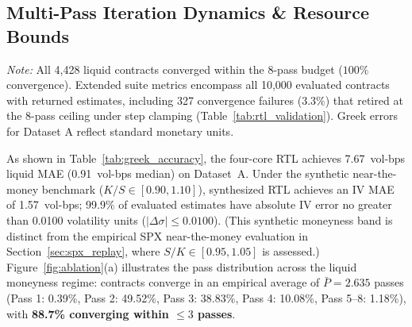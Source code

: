 \documentclass[sigconf,anonymous,review]{acmart}
\begin{document}
\subsection{Multi-Pass Iteration Dynamics \& Resource Bounds}
\label{sec:eval_multipass}
\begin{table}[t]
\caption{Implied Volatility and Greek Accuracy (Synthesized RTL vs. Double-Precision Reference, Dataset A)}
\label{tab:greek_accuracy}
\centering
{}
\vskip 1pt\raggedright
\footnotesize{\textit{Note:} All 4,428 liquid contracts converged within the 8-pass budget ($100\%$ convergence). Extended suite metrics encompass all 10,000 evaluated contracts with returned estimates, including 327 convergence failures ($3.3\%$) that retired at the 8-pass ceiling under step clamping (Table~\ref{tab:rtl_validation}). Greek errors for Dataset A reflect standard monetary units.}
\end{table}
As shown in Table~\ref{tab:greek_accuracy}, the four-core RTL achieves 7.67~vol-bps liquid MAE (0.91~vol-bps median) on Dataset~A. Under the synthetic near-the-money benchmark ($K/S \in [0.90, 1.10]$), synthesized RTL achieves an IV MAE of 1.57~vol-bps; 99.9\% of evaluated estimates have absolute IV error no greater than 0.0100 volatility units ($|\Delta\sigma| \le 0.0100$). (This synthetic moneyness band is distinct from the empirical SPX near-the-money evaluation in Section~\ref{sec:spx_replay}, where $S/K \in [0.95, 1.05]$ is assessed.) Figure~\ref{fig:ablation}(a) illustrates the pass distribution across the liquid moneyness regime: contracts converge in an empirical average of $\bar{P} = 2.635$ passes (Pass 1: 0.39\%, Pass 2: 49.52\%, Pass 3: 38.83\%, Pass 4: 10.08\%, Pass 5--8: 1.18\%), with \textbf{88.7\% converging within $\le 3$ passes}.
\end{document}
